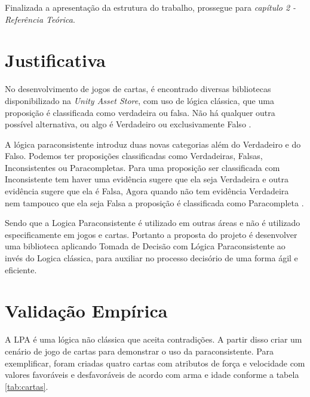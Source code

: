 Finalizada a apresentação da estrutura do trabalho, prossegue para \textit{capítulo 2 - Referência Teórica}.

\section{Justificativa}

No desenvolvimento de jogos de cartas, é encontrado diversas bibliotecas disponibilizado na \textit{Unity Asset Store}, com uso de lógica clássica, que uma proposição é classificada como verdadeira ou falsa. Não há qualquer outra possível alternativa, ou algo é Verdadeiro ou exclusivamente Falso \cite{aspectos-lpa-2013}.

A lógica paraconsistente introduz duas novas categorias além do Verdadeiro e do Falso. Podemos ter proposições classificadas como Verdadeiras, Falsas, Inconsistentes ou Paracompletas. Para uma proposição ser classificada com Inconsistente tem haver uma evidência sugere que ela seja Verdadeira e outra evidência sugere que ela é Falsa, Agora quando não tem evidência Verdadeira nem tampouco que ela seja Falsa a proposição é classificada como Paracompleta \cite{aspectos-lpa-2013}.

Sendo que a Logica Paraconsistente é utilizado em outras áreas e não é utilizado especificamente em jogos e cartas. Portanto a proposta do projeto é desenvolver uma biblioteca aplicando Tomada de Decisão com Lógica Paraconsistente ao invés do Logica clássica, para auxiliar no processo decisório de uma forma ágil e eficiente.


\section{Validação Empírica}

A LPA é uma lógica não clássica que aceita contradições. A partir disso criar um cenário de jogo de cartas para demonstrar o uso da
paraconsistente. Para exemplificar, foram criadas quatro cartas com atributos de força e velocidade com valores favoráveis e desfavoráveis de acordo com arma e idade conforme a tabela \ref{tab:cartas}.

